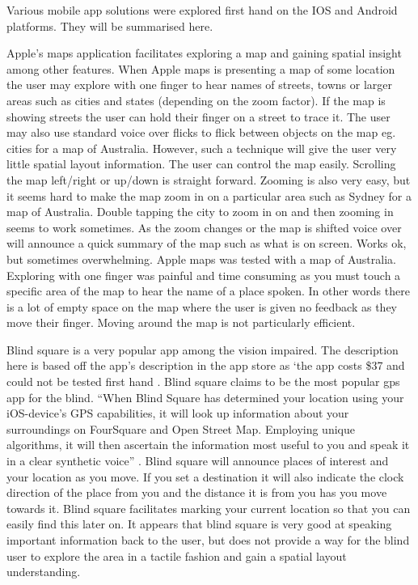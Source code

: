 \documentclass[11pt,twoside,a4paper]{article}
\begin{document}
Various mobile app solutions were explored first hand on the IOS and
Android platforms. They will be summarised here.

Apple's maps application facilitates exploring a map and gaining spatial
insight among other features. When Apple maps is presenting a map of
some location the user may explore with one finger to hear names of
streets, towns or larger areas such as cities and states (depending on
the zoom factor). If the map is showing streets the user can hold their
finger on a street to trace it. The user may also use standard voice
over flicks to flick between objects on the map eg. cities for a map of
Australia. However, such a technique will give the user very little
spatial layout information.  The user can control the map
easily. Scrolling the map left/right or up/down is straight
forward. Zooming is also very easy, but it seems hard to make the map
zoom in on a particular area such as Sydney for a map of
Australia. Double tapping the city to zoom in on and then zooming in
seems to work sometimes. As the zoom changes or the map is shifted voice
over will announce a quick summary of the map such as what is on
screen. Works ok, but sometimes overwhelming.
Apple maps was tested with a map of Australia. Exploring with one finger
was painful and time consuming as you must touch a specific area of the
map to hear the name of a place spoken. In other words there is a lot of
empty space on the map where the user is given no feedback as they move
their finger. Moving around the map is not particularly efficient.

Blind square is a very popular app among the vision impaired. The
description here is based off the app’s description in the app store as
`the app costs \$37 and could not be tested first hand \cite{BlindSquare}.
Blind square claims to be the most popular gps app for the blind. ``When
Blind Square has determined your location using your iOS-device’s GPS
capabilities, it will look up information about your surroundings on
FourSquare and Open Street Map. Employing unique algorithms, it will
then ascertain the information most useful to you and speak it in a
clear synthetic voice'' \cite{BlindSquare}. Blind square will announce places of interest
and your location as you move. If you set a destination it will also
indicate the clock direction of the place from you and the distance it
is from you has you move towards it. Blind square facilitates marking
your current location so that you can easily find this later on. It
appears that blind square is very good at speaking important information
back to the user, but does not provide a way for the blind user to
explore the area in a tactile fashion and gain a spatial layout
understanding.
\end{document}
